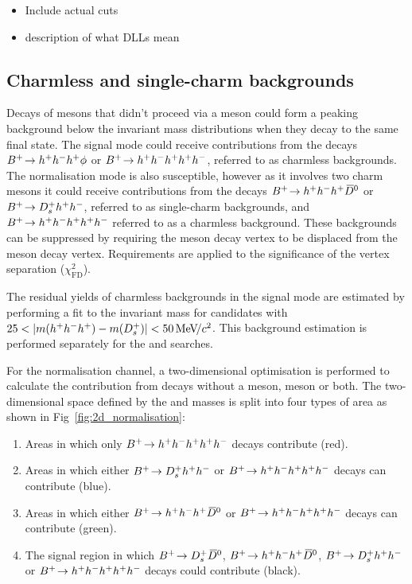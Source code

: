 {\color{Red}
\begin{itemize}
\item Include actual cuts
\item description of what DLLs mean
\end{itemize}
}

\subsection{Charmless and single-charm backgrounds}


Decays of \Bp mesons that didn't proceed via a \D meson could form a peaking background below the invariant mass distributions when they decay to the same final state.
The signal mode could receive contributions from the decays ${{{B}^+}}\!\rightarrow h^{+}h^{-}h^{+}\phi$ or ${{{B}^+}}\!\rightarrow h^{+}h^{-}h^{+}h^{+}h^{-}$, referred to as charmless backgrounds.
The normalisation mode is also susceptible, however as it involves two charm mesons it could receive contributions from the decays ${{{B}^+}}\!\rightarrow h^{+}h^{-}h^{+}{{\kern 0.2em\overline{\kern -0.2em D}{}}{}^0}$ or ${{{B}^+}}\!\rightarrow {\ensuremath{{D}^+_{s}}} h^{+}h^{-}$, referred to as single-charm backgrounds, and ${{{B}^+}}\!\rightarrow h^{+}h^{-}h^{+} h^{+}h^{-}$ referred to as a charmless background.
These backgrounds can be suppressed by requiring the \D meson decay vertex to be displaced from the \Bp meson decay vertex. Requirements are applied to the significance of the vertex separation ($\chi^{2}_{\text{FD}}$).

The residual yields of charmless backgrounds in the signal mode are estimated by performing a fit to the \Bp invariant mass for candidates with $25 < |m(h^{+}h^{-}h^{+}) - m({{D}^+_{s}})| < 50{\mathrm{\,Me\kern -0.1em V\!/}c^2} $. This background estimation is performed separately for the \decay{\Bp}{\Dsp\phiz} and \decay{\Bp}{\Dsp\Kp\Km} searches. 

For the \decay{\Bp}{\Dsp\Dzb} normalisation channel, a two-dimensional optimisation is performed to calculate the contribution from decays without a \Dsp meson, \Dzb meson or both. 
The two-dimensional space defined by the \Dsp and \Dzb masses is split into four types of area as shown in Fig~\ref{fig:2d_normalisation}:
\begin{enumerate}
\item Areas in which only ${{{B}^+}}\!\rightarrow h^{+}h^{-}h^{+}h^{+}h^{-}$ decays contribute (red).
\item Areas in which either ${{{B}^+}}\!\rightarrow D_{s}^{+}h^{+}h^{-}$  or ${{{B}^+}}\!\rightarrow h^{+}h^{-}h^{+} h^{+}h^{-}$ decays can contribute (blue). 

\item Areas in which either ${{{B}^+}}\!\rightarrow h^{+}h^{-}h^{+}{{\kern 0.2em\overline{\kern -0.2em D}{}}{}^0}$ or ${{{B}^+}}\!\rightarrow h^{+}h^{-}h^{+} h^{+}h^{-}$ decays can contribute (green). 
\item The signal region in which ${{{B}^+}}\!\rightarrow D_{s}^{+} {{\kern 0.2em\overline{\kern -0.2em D}{}}{}^0}$, ${{{B}^+}}\!\rightarrow h^{+}h^{-}h^{+}{{\kern 0.2em\overline{\kern -0.2em D}{}}{}^0}$, ${{{B}^+}}\!\rightarrow D_{s}^{+}h^{+}h^{-}$ or ${{{B}^+}}\!\rightarrow h^{+}h^{-}h^{+}h^{+}h^{-}$ decays could contribute (black).
\end{enumerate}   

